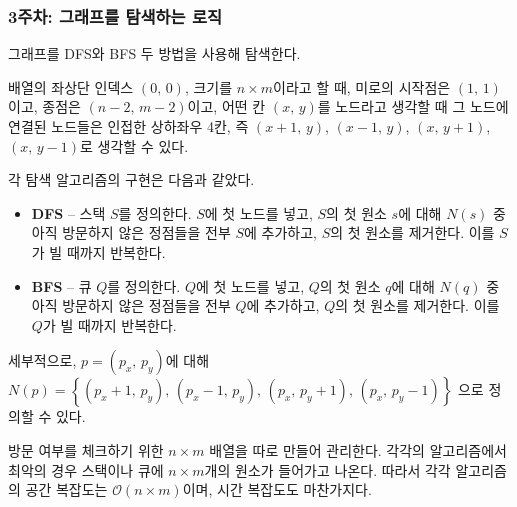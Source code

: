 \subsubsection{3주차: 그래프를 탐색하는 로직} 그래프를 DFS와 BFS 두 방법을 사용해 탐색한다.

배열의 좌상단 인덱스 $\left(0,\,0\right)$, 크기를 $n\times m$이라고 할 때, 미로의 시작점은 $\left(1,\,1\right)$이고, 
종점은 $\left(n-2,\,m-2\right)$이고, 어떤 칸 $\left(x,\,y\right)$를 노드라고 생각할 때 그 노드에 연결된 노드들은 인접한 상하좌우 4칸, 즉
$\left(x + 1,\,y\right)$, $\left(x - 1,\,y\right)$, $\left(x,\,y + 1\right)$, $\left(x,\,y - 1\right)$로 생각할 수 있다.

각 탐색 알고리즘의 구현은 다음과 같았다.

\begin{itemize}
    \item \textbf{DFS} -- 스택 $S$를 정의한다. $S$에 첫 노드를 넣고,
    $S$의 첫 원소 $s$에 대해 $N\left(s\right)$ 중 아직 방문하지 않은 정점들을 전부 $S$에 추가하고,
    $S$의 첫 원소를 제거한다. 이를 $S$가 빌 때까지 반복한다. 
    \item \textbf{BFS} -- 큐 $Q$를 정의한다. $Q$에 첫 노드를 넣고,
    $Q$의 첫 원소 $q$에 대해 $N\left(q\right)$ 중 아직 방문하지 않은 정점들을 전부 $Q$에 추가하고,
    $Q$의 첫 원소를 제거한다. 이를 $Q$가 빌 때까지 반복한다. 
\end{itemize}

세부적으로, $p=\left(p_x,\,p_y\right)$에 대해
$N\left(p\right)=\left\{\left(p_x + 1,\,p_y\right),\,\left(p_x - 1,\,p_y\right),\,\left(p_x,\,p_y + 1\right),\,\left(p_x,\,p_y - 1\right)\right\}$
으로 정의할 수 있다.

방문 여부를 체크하기 위한 $n\times m$ 배열을 따로 만들어 관리한다. 각각의 알고리즘에서 최악의 경우 스택이나 큐에 $n\times m$개의 원소가 들어가고 나온다.
따라서 각각 알고리즘의 공간 복잡도는 $\mathcal{O}\left(n\times m\right)$이며, 시간 복잡도도 마찬가지다.